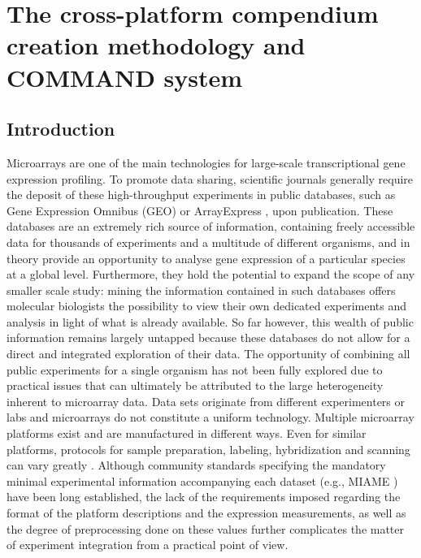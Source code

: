 \chapter{The cross-platform compendium creation methodology and COMMAND 
system}\label{ch:command}


\instructionsintroduction


\section{Introduction}

Microarrays are one of the main technologies for large-scale transcriptional
gene expression profiling.
%
To promote data sharing, scientific journals generally require the deposit of
these high-throughput experiments in public databases, such as Gene Expression
Omnibus (GEO) \cite{Barrett2011} or ArrayExpress \cite{Parkinson2009}, upon
publication.
%
These databases are an extremely rich source of information, containing freely
accessible data for thousands of experiments and a multitude of different
organisms, and in theory provide an opportunity to analyse gene expression of a
particular species at a global level.
%
Furthermore, they hold the potential to expand the scope of any smaller scale
study: mining the information contained in such databases offers molecular
biologists the possibility to view their own dedicated experiments and analysis
in light of what is already available.
%
So far however, this wealth of public information remains largely untapped
because these databases do not allow for a direct and integrated exploration of
their data.
%
The opportunity of combining all public experiments for a single organism has
not been fully explored due to practical issues that can ultimately be
attributed to the large heterogeneity inherent to microarray data.
%
Data sets originate from different experimenters or labs and microarrays do not
constitute a uniform technology.
%
Multiple microarray platforms exist and are manufactured in different
ways.  Even for similar platforms, protocols for sample preparation,
labeling, hybridization and scanning can vary greatly
\cite{Kerr2001,Zakharkin2005}.
%
Although community standards specifying the mandatory minimal experimental
information accompanying each dataset (e.g., MIAME \cite{Brazma2001}) have been
long established, the lack of the requirements \cite{Brazma2009} imposed
regarding the format of the platform descriptions and the expression
measurements, as well as the degree of preprocessing done on these values
further complicates the matter of experiment integration from a practical point
of view.


